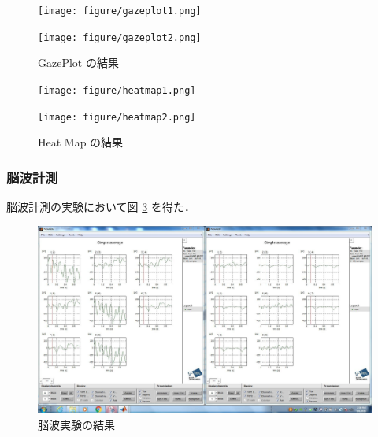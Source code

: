 \documentclass[dvipdfmx, titlepage, t]{jsarticle}
\begin{document}
        \begin{figure}[H]
            \centering
            \begin{minipage}[b]{0.48\linewidth}
                \centering
                \texttt{[image: figure/gazeplot1.png]}
            \end{minipage}
            \begin{minipage}[b]{0.48\linewidth}
                \centering
                \texttt{[image: figure/gazeplot2.png]}
            \end{minipage}
            \caption{GazePlot の結果}
            \label{fig:gaze}
        \end{figure}

               \begin{figure}[H]
            \centering
            \begin{minipage}[b]{0.48\linewidth}
                \centering
                \texttt{[image: figure/heatmap1.png]}
            \end{minipage}
            \begin{minipage}[b]{0.48\linewidth}
                \centering
                \texttt{[image: figure/heatmap2.png]}
            \end{minipage}
            \caption{Heat Map の結果}
            \label{fig:heat}
        \end{figure}
        
    \subsubsection{脳波計測}
        脳波計測の実験において図 \ref{fig:label} を得た．

        \begin{figure}[H]
            \centering
            \includegraphics[keepaspectratio, width=0.7\linewidth]{figure/2025-5-6.JPG}
            \caption{脳波実験の結果}
            \label{fig:label}
        \end{figure}
\end{document}
